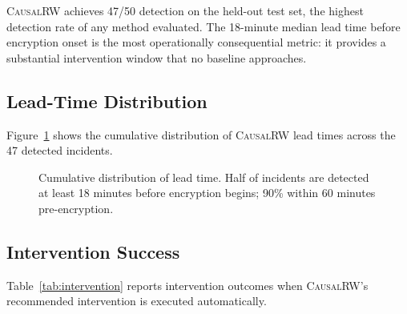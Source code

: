 \documentclass[sigconf,nonacm]{acmart}
\begin{document}
\textsc{CausalRW} achieves 47/50 detection on the held-out test set,
the highest detection rate of any method evaluated. The 18-minute
median lead time before encryption onset is the most operationally
consequential metric: it provides a substantial intervention window
that no baseline approaches.

\subsection{Lead-Time Distribution}

Figure~\ref{fig:leadtime} shows the cumulative distribution of
\textsc{CausalRW} lead times across the 47 detected incidents.

\begin{figure}[h]
\centering
{}
\caption{Cumulative distribution of lead time. Half of incidents are
  detected at least 18 minutes before encryption begins; 90\% within
  60 minutes pre-encryption.}
\label{fig:leadtime}
\end{figure}

\subsection{Intervention Success}

Table~\ref{tab:intervention} reports intervention outcomes when
\textsc{CausalRW}'s recommended intervention is executed
automatically.
\end{document}
